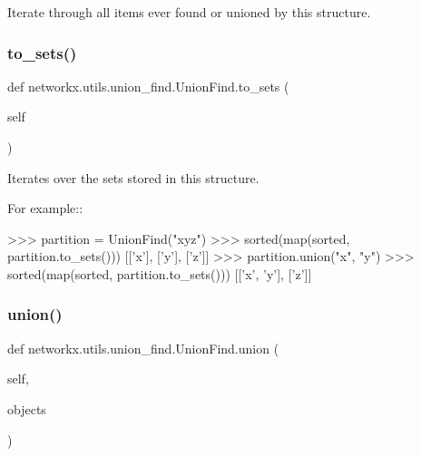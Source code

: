 \begin{DoxyVerb}Iterate through all items ever found or unioned by this structure.\end{DoxyVerb}
 \mbox{\label{classnetworkx_1_1utils_1_1union__find_1_1UnionFind_a8ded68db5c76fb2bd008e51156902ad3}} 
\subsubsection{\texorpdfstring{to\+\_\+sets()}{to\_sets()}}
{\footnotesize\ttfamily def networkx.\+utils.\+union\+\_\+find.\+Union\+Find.\+to\+\_\+sets (\begin{DoxyParamCaption}\item[{}]{self }\end{DoxyParamCaption})}

\begin{DoxyVerb}Iterates over the sets stored in this structure.

For example::

    >>> partition = UnionFind("xyz")
    >>> sorted(map(sorted, partition.to_sets()))
    [['x'], ['y'], ['z']]
    >>> partition.union("x", "y")
    >>> sorted(map(sorted, partition.to_sets()))
    [['x', 'y'], ['z']]\end{DoxyVerb}
 \mbox{\label{classnetworkx_1_1utils_1_1union__find_1_1UnionFind_ad112493d8588afcd5672fe5197028654}} 
\subsubsection{\texorpdfstring{union()}{union()}}
{\footnotesize\ttfamily def networkx.\+utils.\+union\+\_\+find.\+Union\+Find.\+union (\begin{DoxyParamCaption}\item[{}]{self,  }\item[{}]{objects }\end{DoxyParamCaption})}

